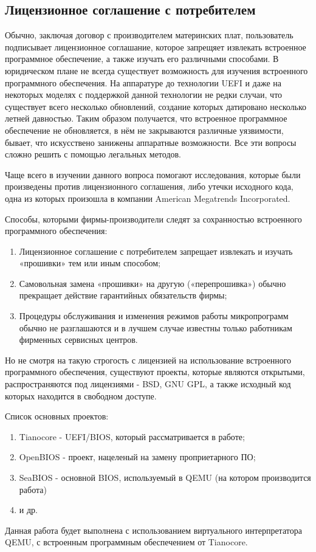 \subsection{Лицензионное соглашение с потребителем}
Обычно, заключая договор с производителем материнских плат,
	пользователь подписывает лицензионное соглашание,
		которое запрещяет извлекать встроенное программное обеспечение, а также изучать его различными способами.
В юридическом плане не всегда существует возможность для изучения встроенного программного обеспечения.
На аппаратуре до технологии UEFI и даже на некоторых моделях с поддержкой данной технологии не редки случаи,
	что существует всего несколько обновлений,
		создание которых датировано несколько летней давностью.
Таким образом получается,
	что встроенное программное обеспечение не обновляется,
	в нём не закрываются различные уязвимости,
	бывает, что искусствено занижены аппаратные возможности.
Все эти вопросы сложно решить с помощью легальных методов.

Чаще всего в изучении данного вопроса помогают исследования,
	которые были произведены против лицензионного соглашения,
	либо утечки исходного кода,
		одна из которых произошла в компании American Megatrends Incorporated\cite{news:AMIinsyde}.

Способы, которыми фирмы-производители следят за сохранностью встроенного программного обеспечения\cite{wiki:firmware}:
\begin{enumerate}
\item Лицензионное соглашение с потребителем запрещает извлекать и изучать «прошивки» тем или иным способом;
\item Самовольная замена «прошивки» на другую («перепрошивка») обычно прекращает действие гарантийных обязательств фирмы;
\item Процедуры обслуживания и изменения режимов работы микропрограмм обычно не разглашаются и в лучшем случае известны только работникам фирменных сервисных центров.
\end{enumerate}

Но не смотря на такую строгость с лицензией на использование встроенного программного обеспечения,
	существуют проекты,
		которые являются открытыми,
		распространяются под лицензиями - BSD, GNU GPL, 
	а также исходный код которых находится в свободном доступе.

Список основных проектов:
\begin{enumerate}
\item Tianocore\cite{proj:Tianocore} - UEFI/BIOS, который рассматривается в работе;
\item OpenBIOS\cite{proj:OpenBIOS} - проект, нацеленый на замену проприетарного ПО;
\item SeaBIOS\cite{proj:SeaBIOS} - основной BIOS, используемый в QEMU (на котором производится работа)
\item и др.
\end{enumerate}

Данная работа будет выполнена с использованием виртуального интерпретатора QEMU, с встроенным программным обеспечением от Tianocore.
